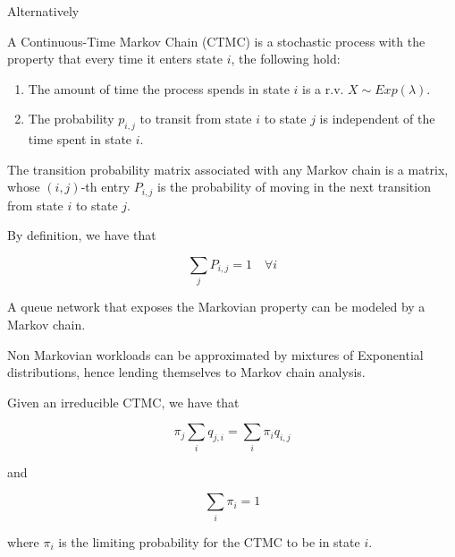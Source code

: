 Alternatively

\begin{definition}
	\label{def:continuous-time-markov-chain-2}
	
	A Continuous-Time Markov Chain (CTMC) is a stochastic process with the property that every time it enters state $i$, the following hold:
	
	\begin{enumerate}
		\item The amount of time the process spends in state $i$ is a r.v. $X \sim Exp(\lambda)$.
		
		\item The probability $p_{i,j}$ to transit from state $i$ to state $j$ is independent of the time spent in state $i$.
	\end{enumerate}
\end{definition}

\begin{definition}
\label{def:transition-probability-matrix}
	
	The transition probability matrix associated with any Markov chain is a matrix, whose $(i,j)$-th entry $P_{i,j}$ is the probability of moving in the next transition from state $i$ to state $j$.
\end{definition}

By definition, we have that 

\begin{equation*}
\sum_{j} P_{i,j} = 1 \quad \forall i
\end{equation*}

A queue network that exposes the Markovian property can be modeled by a Markov chain.

Non Markovian workloads can be approximated by mixtures of Exponential distributions, hence lending themselves to Markov chain analysis.

\begin{theorem}
\label{thm:balance-equations-continuous-time-markov-chains}

	Given an irreducible CTMC, we have that
	
	\begin{equation}
		\pi_{j} \sum_{i} q_{j,i} = \sum_{i} \pi_{i} q_{i,j} 
	\end{equation}
	
	and
	
	\begin{equation}
		\sum_{i} \pi_{i} = 1
	\end{equation}
	
	where $\pi_{i}$ is the limiting probability for the CTMC to be in state $i$.
\end{theorem}

